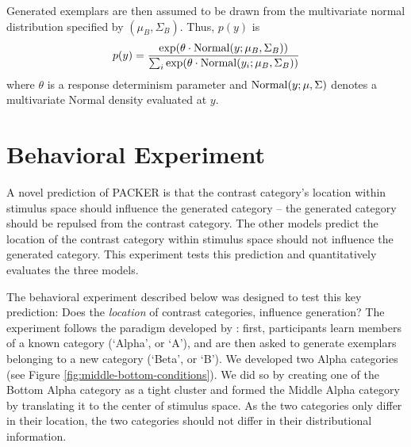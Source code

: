 \documentclass[10pt,letterpaper]{article}
\begin{document}
Generated exemplars are then assumed to be drawn from the multivariate normal distribution specified by $(\mu_{B}, \Sigma_{B})$. Thus, $p(y)$ is
\begin{equation}
  p(y) = \dfrac
    {\exp( \theta \cdot {\rm Normal}(y; \mu_{B}, \Sigma_{B}))}
    {\sum_i \exp( \theta \cdot {\rm Normal}(y_i; \mu_{B}, \Sigma_{B}))} 
\end{equation}
where $\theta$ is a response determinism parameter and ${\rm Normal}(y; \mu, \Sigma)$ denotes a multivariate Normal density evaluated at $y$.
\section{Behavioral Experiment}
A novel prediction of PACKER is that the contrast category's location within stimulus space should influence the generated category -- the generated category should be repulsed from the contrast category. The other models predict the location of the contrast category within stimulus space should not influence the generated category. This experiment tests this prediction and quantitatively evaluates the three models.


The behavioral experiment described below was designed to test this key prediction:  Does the \textit{location} of contrast categories, influence generation? The experiment follows the paradigm developed by \citet{jern2013probabilistic}: first, participants learn members of a known category (`Alpha', or `A'), and are then asked to generate exemplars belonging to a new category (`Beta', or `B'). We developed two Alpha categories (see Figure \ref{fig:middle-bottom-conditions}). We did so by creating one of the Bottom Alpha category as a tight cluster and formed the Middle Alpha category by translating it to the center of stimulus space. As the two categories only differ in their location, the two categories should not differ in their distributional information.
\end{document}
